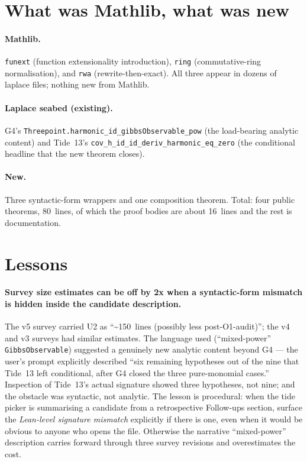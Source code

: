 \documentclass[11pt]{article}
\begin{document}
\section{What was Mathlib, what was new}

\paragraph{Mathlib.} \texttt{funext} (function extensionality
introduction), \texttt{ring} (commutative-ring normalisation), and
\texttt{rwa} (rewrite-then-exact). All three appear in dozens of
laplace files; nothing new from Mathlib.

\paragraph{Laplace seabed (existing).} G4's
\texttt{Threepoint.harmonic\_id\_gibbsObservable\_pow} (the
load-bearing analytic content) and Tide~13's
\texttt{cov\_h\_id\_id\_deriv\_harmonic\_eq\_zero} (the conditional
headline that the new theorem closes).

\paragraph{New.} Three syntactic-form wrappers and one composition
theorem. Total: four public theorems, 80~lines, of which the proof
bodies are about 16~lines and the rest is documentation.

\section{Lessons}

\paragraph{Survey size estimates can be off by 2x when a
syntactic-form mismatch is hidden inside the candidate description.}
The v5 survey carried U2 as ``\textasciitilde 150~lines (possibly less
post-O1-audit)''; the v4 and v3 surveys had similar estimates. The
language used (``mixed-power'' \texttt{GibbsObservable}) suggested a
genuinely new analytic content beyond G4 — the user's prompt
explicitly described ``six remaining hypotheses out of the nine that
Tide~13 left conditional, after G4 closed the three pure-monomial
cases.'' Inspection of Tide~13's actual signature showed three
hypotheses, not nine; and the obstacle was syntactic, not analytic.
The lesson is procedural: when the tide picker is summarising a
candidate from a retrospective Follow-ups section, surface the
\emph{Lean-level signature mismatch} explicitly if there is one, even
when it would be obvious to anyone who opens the file. Otherwise the
narrative ``mixed-power'' description carries forward through three
survey revisions and overestimates the cost.
\end{document}

